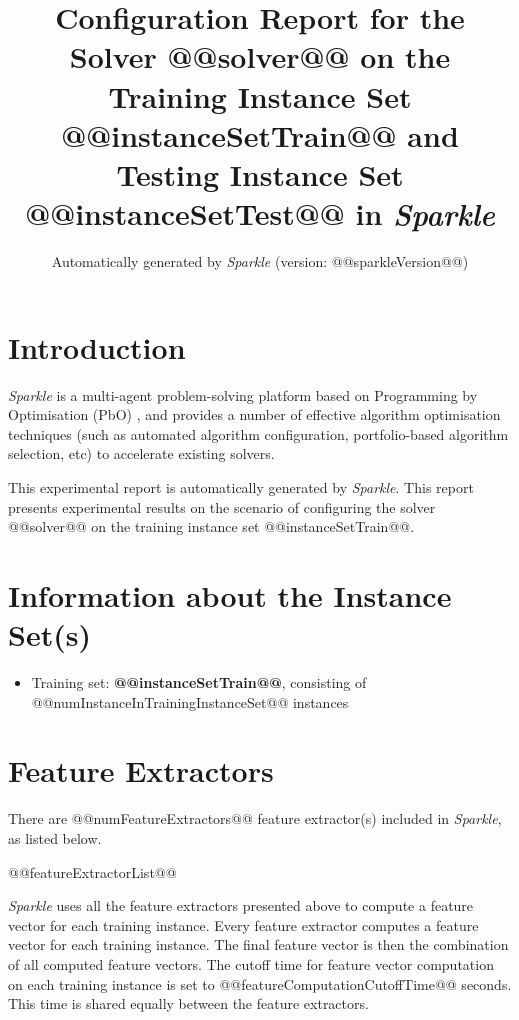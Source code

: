 \documentclass[british]{article}
\title{Configuration Report for the Solver @@solver@@ on the Training Instance Set @@instanceSetTrain@@ \iftest and Testing Instance Set @@instanceSetTest@@ \fi in \emph{Sparkle} }
\author{ Automatically generated by \emph{Sparkle} (version: @@sparkleVersion@@) }
\newif\iftest
\newif\iffeatures
\begin{document}
\maketitle %


\section{Introduction}
\label{sec:Introduction}

\emph{Sparkle} \cite{Hoos15} is a multi-agent problem-solving platform based on Programming by Optimisation (PbO) \cite{Hoos12}, and provides a number of effective algorithm optimisation techniques (such as automated algorithm configuration, portfolio-based algorithm selection, etc) to accelerate existing solvers.

This experimental report is automatically generated by \emph{Sparkle}. This report presents experimental results on the scenario of configuring the solver @@solver@@ on the training instance set @@instanceSetTrain@@\iftest~and evaluating it on the testing instance set @@instanceSetTest@@\fi.


\section{Information about the Instance Set(s)}

\begin{itemize}
\item Training set: \textbf{@@instanceSetTrain@@}, consisting of @@numInstanceInTrainingInstanceSet@@ instances
\iftest\item \textbf{@@instanceSetTest@@}, consisting of @@numInstanceInTestingInstanceSet@@ instances\fi
\end{itemize}


\iffeatures
    \section{Feature Extractors}
        There are @@numFeatureExtractors@@ feature extractor(s) included in \emph{Sparkle}, as listed below.

        \begin{enumerate}
        @@featureExtractorList@@
        \end{enumerate}

        \emph{Sparkle} uses all the feature extractors presented above to compute a feature vector for each training instance. Every feature extractor computes a feature vector for each training instance. The final feature vector is then the combination of all computed feature vectors. The cutoff time for feature vector computation on each training instance is set to @@featureComputationCutoffTime@@ seconds. This time is shared equally between the feature extractors.
\end{document}
